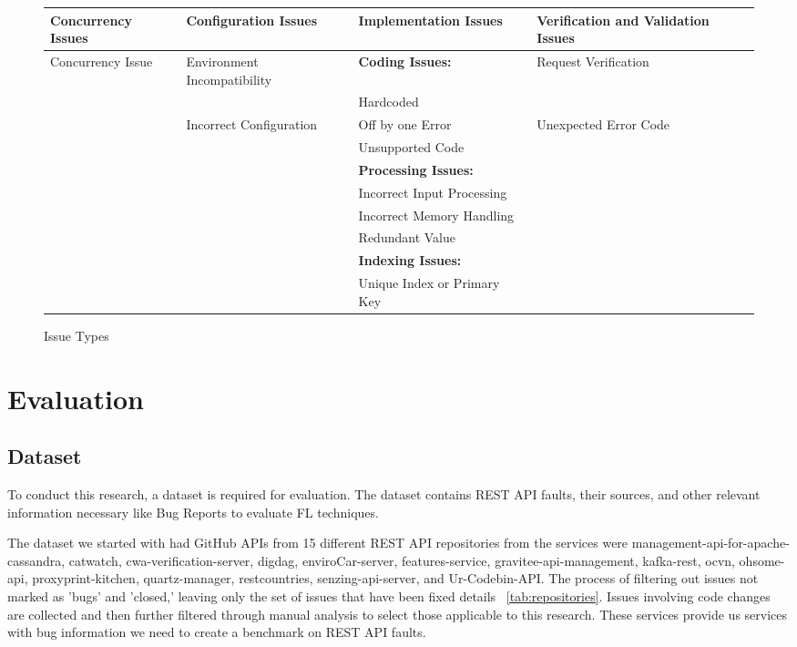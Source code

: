 \documentclass[conference]{IEEEtran}
\begin{document}
\begin{figure}[t]
    \caption{Issue Types}
    \label{fig:issueTypes}
    \begin{tabular}{|m{3cm}|m{3 cm}|m{5cm}|m{5cm}|}
    \hline
    \textbf{Concurrency Issues} & \textbf{Configuration Issues} & \textbf{Implementation Issues} & \textbf{Verification and Validation Issues} \\
    \hline
    Concurrency Issue & Environment Incompatibility & \textbf{Coding Issues:} & Request Verification \\
     &  & Hardcoded &  \\
     & Incorrect Configuration & Off by one Error & Unexpected Error Code \\
     &  & Unsupported Code &  \\
    \hline
     &  & \textbf{Processing Issues:} &  \\
     &  & Incorrect Input Processing &  \\
     &  & Incorrect Memory Handling &  \\
     &  & Redundant Value &  \\
    \hline
     &  & \textbf{Indexing Issues:} &  \\
     &  & Unique Index or Primary Key &  \\
    \hline
    \end{tabular}
\end{figure}

\section{Evaluation}
\label{sec:evaluation}

\subsection{Dataset}
\label{sec:dataset}

To conduct this research, a dataset is required for evaluation. The dataset contains REST API faults, their sources, and other relevant information necessary like Bug Reports to evaluate FL techniques.

The dataset we started with had  GitHub APIs from 15 different REST API repositories from the services were management-api-for-apache-cassandra, catwatch, cwa-verification-server, digdag, enviroCar-server, features-service,
gravitee-api-management, kafka-rest, ocvn, ohsome-api, proxyprint-kitchen, quartz-manager, restcountries, senzing-api-server, and Ur-Codebin-API.
The  process of filtering out issues not marked as 'bugs' and 'closed,' leaving only the set of issues that have been fixed details ~\ref{tab:repositories}. Issues involving code changes are collected and then further filtered through manual analysis to select those applicable to this research. These services provide us services with bug information we need to create a benchmark on REST API faults.
\end{document}
